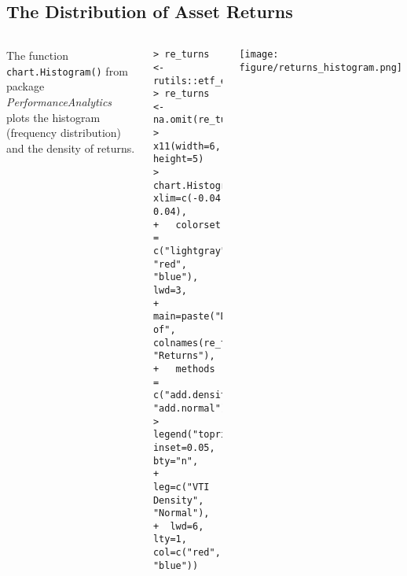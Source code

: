 \documentclass[10pt]{beamer}\usepackage[]{graphicx}\usepackage[]{color}
\makeatletter
\newenvironment{kframe}{%
 \def\at@end@of@kframe{}%
 \ifinner\ifhmode%
  \def\at@end@of@kframe{\end{minipage}}%
  \begin{minipage}{\columnwidth}%
 \fi\fi%
 \def\FrameCommand##1{\hskip\@totalleftmargin \hskip-\fboxsep
 \colorbox{shadecolor}{##1}\hskip-\fboxsep
     \hskip-\linewidth \hskip-\@totalleftmargin \hskip\columnwidth}%
 \MakeFramed {\advance\hsize-\width
   \@totalleftmargin\z@ \linewidth\hsize
   \@setminipage}}%
 {\par\unskip\endMakeFramed%
 \at@end@of@kframe}
\newenvironment{knitrout}{}{} %
\makeatother
\begin{document}
\subsection{The Distribution of Asset Returns}
\begin{frame}[fragile,t]{\subsecname}
\vspace{-1em}
\begin{block}{}
  \begin{columns}[T]
      The function \texttt{chart.Histogram()} from package \emph{PerformanceAnalytics} plots the histogram (frequency distribution) and the density of returns.
\begin{knitrout}\tiny
{}\color{fgcolor}\begin{kframe}
\begin{verbatim}
> re_turns <- rutils::etf_env$re_turns$VTI
> re_turns <- na.omit(re_turns)
> x11(width=6, height=5)
> chart.Histogram(re_turns, xlim=c(-0.04, 0.04),
+   colorset = c("lightgray", "red", "blue"), lwd=3,
+   main=paste("Distribution of", colnames(re_turns), "Returns"),
+   methods = c("add.density", "add.normal"))
> legend("topright", inset=0.05, bty="n",
+  leg=c("VTI Density", "Normal"),
+  lwd=6, lty=1, col=c("red", "blue"))
\end{verbatim}
\end{kframe}
\end{knitrout}
    \vspace{-1em}
      \texttt{[image: figure/returns\_histogram.png]}
  \end{columns}
\end{block}

\end{frame}


\end{document}
